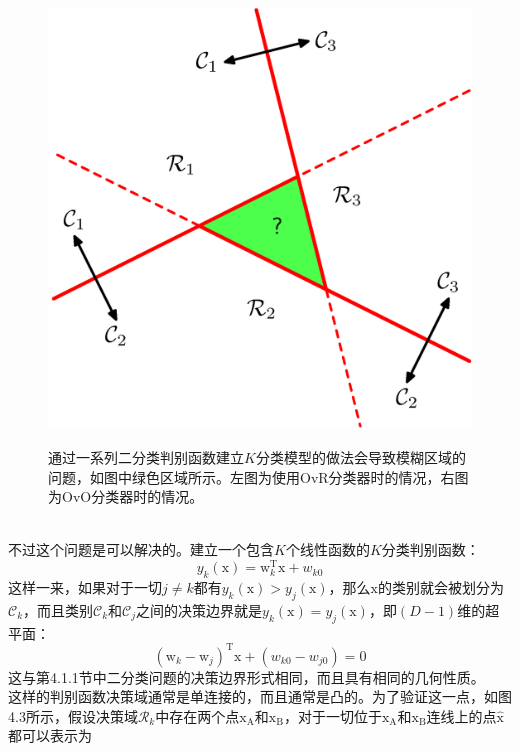 \documentclass[b5paper]{book}
\numberwithin{equation}{chapter}
\newcommand {\bx} {\boldsymbol{\mathrm{x}}}
\newcommand {\bw} {\boldsymbol{\mathrm{w}}}
\newcommand {\rmT} {\mathrm{T}}
\newcommand {\calR} {\mathcal{R}}
\begin{document}
{\begin{figure}[ht]
\begin{minipage}[t]{0.5\linewidth}
		\includegraphics[scale=0.8]{Images/4-2b.png}
		\label{fig:4-2b}
		\end{minipage}
		\caption{通过一系列二分类判别函数建立$K$分类模型的做法会导致模糊区域的问题，如图中绿色区域所示。左图为使用OvR分类器时的情况，右图为OvO分类器时的情况。}
	\end{figure}
	\\
	\indent 不过这个问题是可以解决的。建立一个包含$K$个线性函数的$K$分类判别函数：
	\begin{equation}
		y_k(\bx) = \bw_k^{\rmT} \bx + w_{k0}
	\end{equation}
	这样一来，如果对于一切$j \neq k$都有$y_k(\bx)>y_j(\bx)$，那么$\bx$的类别就会被划分为$\mathcal{C}_k$，而且类别$\mathcal{C}_k$和$\mathcal{C}_j$之间的决策边界就是$y_k(\bx) = y_j(\bx)$，即$(D-1)$维的超平面：
	\begin{equation}
		(\bw_k - \bw_j)^{\rmT} \bx + (w_{k0} - w_{j0}) = 0
	\end{equation}
	这与第4.1.1节中二分类问题的决策边界形式相同，而且具有相同的几何性质。\\
	\indent 这样的判别函数决策域通常是单连接的，而且通常是凸的。为了验证这一点，如图4.3所示，假设决策域$\calR_k$中存在两个点$\bx_{\mathrm{A}}$和$\bx_{\mathrm{B}}$，对于一切位于$\bx_{\mathrm{A}}$和$\bx_{\mathrm{B}}$连线上的点$\hat{\bx}$都可以表示为
	\begin{equation}

\end{equation}}
\end{document}
